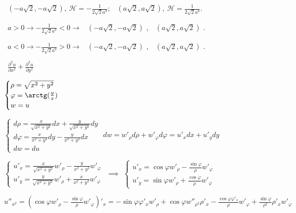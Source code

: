 \documentclass{report}
\begin{document}
\ $ (-a\sqrt{2}, -a\sqrt{2}),\ \mathcal{H} = -\frac{1}{2\sqrt{2}a^9}; $
\ $ (a\sqrt{2}, a\sqrt{2}),\ \mathcal{H} = \frac{1}{2\sqrt{2}a^9}. $

\ $ a > 0 \rightarrow  -\frac{1}{2\sqrt{2}a^9} < 0 \rightarrow $
\ $ (-a\sqrt{2}, -a\sqrt{2}) $ ,\
\ $ (a\sqrt{2}, a\sqrt{2}) $ .

\ $ a < 0 \rightarrow  -\frac{1}{2\sqrt{2}a^9} > 0 \rightarrow $
\text{точка}\ $ (-a\sqrt{2}, -a\sqrt{2}) $ \text{-- max},\
\text{а}\ $ (a\sqrt{2}, a\sqrt{2}) $ .

\
$ \frac{\partial^2 u}{\partial x^2} + \frac{\partial^2 u}{\partial y^2} $

$ \begin{cases}
    \rho = \sqrt{x^2 + y^2}\\
    \varphi = \arctg(\frac{y}{x})\\
    w = u
\end{cases} $

$ \begin{cases}
    d\rho = \frac{x}{\sqrt{x^2 + y^2}} dx + \frac{y}{\sqrt{x^2 + y^2}} dy\\
    d\varphi = \frac{x}{x^2 + y^2} dy - \frac{y}{x^2 + y^2} dx\\
    dw = du
\end{cases} $
\indent
$ dw = w'_{\rho} d\rho + w'_{\varphi} d\varphi = u'_x dx + u'_y dy $

$ \begin{cases}
    u'_x = \frac{x}{\sqrt{x^2 + y^2}} w'_{\rho} - \frac{y}{x^2 + y^2} w'_{\varphi}\\
    u'_y = \frac{y}{\sqrt{x^2 + y^2}} w'_{\rho} + \frac{x}{x^2 + y^2} w'_{\varphi}
\end{cases} $
$ \implies $
$ \begin{cases}
    u'_x = \cos{\varphi} w'_{\rho} - \frac{\sin{\varphi}}{\rho} w'_{\varphi}\\
    u'_y = \sin{\varphi} w'_{\rho} + \frac{\cos{\varphi}}{\rho} w'_{\varphi}
\end{cases} $

$ u''_{x^{2}} = (\cos{\varphi} w'_{\rho} - \frac{\sin{\varphi}}{\rho} w'_{\varphi})'_x
 = -\sin{\varphi} \varphi'_x w'_{\rho} + \cos{\varphi} w''_{\rho^2} \rho'_x
 - \frac{\cos{\varphi} \varphi'_x}{\rho} w'_{\varphi}
 + \frac{\sin{\varphi}}{\rho^2} \rho'_x w'_{\varphi } $
\end{document}
